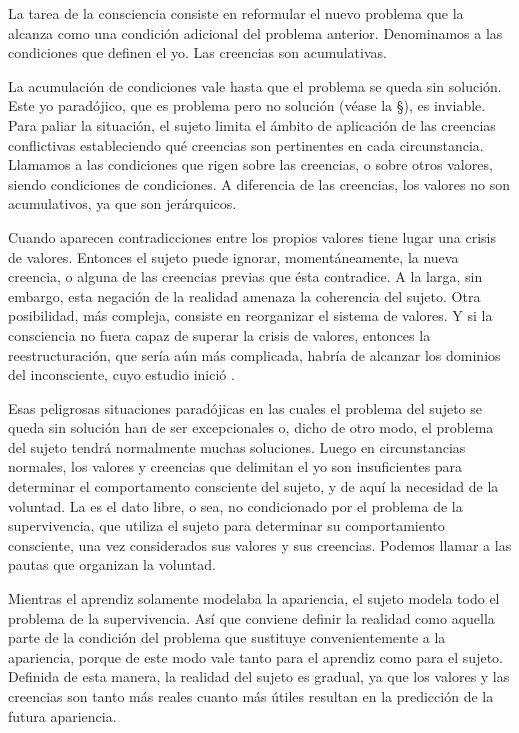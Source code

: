\label{creencias}
La tarea de la consciencia consiste en reformular el nuevo problema que la
alcanza como una condición adicional del problema anterior. Denominamos
 a las condiciones que definen el yo. Las creencias
son acumulativas.

La acumulación de condiciones vale hasta que el problema se queda sin
solución.  Este yo paradójico, que es problema pero no solución (véase la
\S{}), es inviable. Para paliar la situación,
el sujeto limita el ámbito de aplicación de las creencias conflictivas
estableciendo qué creencias son pertinentes en cada circunstancia. Llamamos
 a las condiciones que rigen sobre las creencias, o
sobre otros valores, siendo condiciones de condiciones.  A diferencia de las
creencias, los valores no son acumulativos, ya que son jerárquicos.

Cuando aparecen contradicciones entre los propios valores tiene lugar una
crisis de valores.  Entonces el sujeto puede ignorar, momentáneamente, la
nueva creencia, o alguna de las creencias previas que ésta contradice. A
la larga, sin embargo, esta negación de la realidad amenaza la coherencia
del sujeto.  Otra posibilidad, más compleja, consiste en reorganizar el
sistema de valores. Y si la consciencia no fuera capaz de superar la crisis
de valores, entonces la reestructuración, que sería aún más
complicada, habría de alcanzar los dominios del inconsciente, cuyo estudio
inició \cite{Freud1900}.

Esas peligrosas situaciones paradójicas en las cuales el problema del
sujeto se queda sin solución han de ser excepcionales o, dicho de otro
modo, el problema del sujeto tendrá normalmente muchas soluciones. Luego
en circunstancias normales, los valores y creencias que delimitan el yo son
insuficientes para determinar el comportamento consciente del sujeto, y de
aquí la necesidad de la voluntad.  La  es el dato
libre, o sea, no condicionado por el problema de la supervivencia, que
utiliza el sujeto para determinar su comportamiento consciente, una vez
considerados sus valores y sus creencias. Podemos llamar 
a las pautas que organizan la voluntad.

Mientras el aprendiz solamente modelaba la apariencia, el sujeto modela
todo el problema de la supervivencia.  Así que conviene definir la
realidad como aquella parte de la condición del problema que sustituye
convenientemente a la apariencia, porque de este modo vale tanto para el
aprendiz como para el sujeto.  Definida de esta manera, la realidad del
sujeto es gradual, ya que los valores y las creencias son tanto más
reales cuanto más útiles resultan en la predicción de la futura
apariencia.

